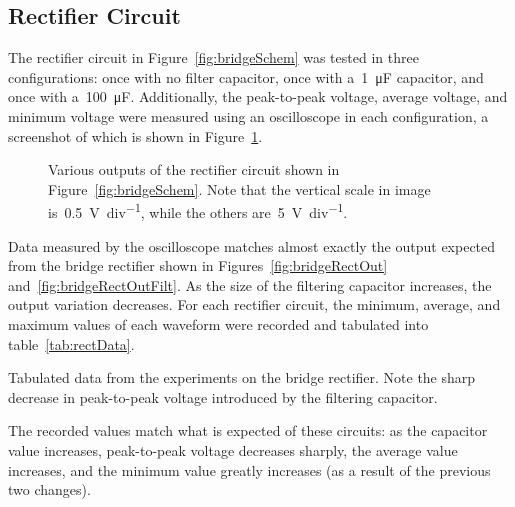 \subsection{Rectifier Circuit}
The rectifier circuit in Figure~\ref{fig:bridgeSchem} was tested in three
configurations: once with no filter capacitor, once with a~\SI{1}{\micro\farad}
capacitor, and once with a~\SI{100}{\micro\farad}.  Additionally, the
peak-to-peak voltage, average voltage, and minimum voltage were measured using
an oscilloscope in each configuration, a screenshot of which is shown in
Figure~\ref{fig:rectShots}.
%
\begin{figure}[H]
	\centering
	\quad
	\quad

	\parbox{.9\textwidth}{
	\caption[Oscilloscope Screenshot --- Rectifier Circuit]{Various outputs of
	the rectifier circuit shown in Figure~\ref{fig:bridgeSchem}.  Note that the
	vertical scale in image~ is~\SI{.5}{\volt\per
	div}, while the others are~\SI{5}{\volt\per div}.}
	\label{fig:rectShots}}
\end{figure}
%
Data measured by the oscilloscope matches almost exactly the output expected
from the bridge rectifier shown in Figures~\ref{fig:bridgeRectOut}
and~\ref{fig:bridgeRectOutFilt}.  As the size of the filtering capacitor
increases, the output variation decreases.  For each rectifier circuit, the minimum, average, and maximum
values of each waveform were recorded and tabulated into
table~\ref{tab:rectData}.
%
\begin{table}[H]
	\centering
	
	\parbox{.6\textwidth}{
	\caption[Rectifier data]{Tabulated data from the experiments on the bridge
	rectifier.  Note the sharp decrease in peak-to-peak voltage introduced by
	the filtering capacitor.}
	\label{tab:rectData}
	}
\end{table}
%
The recorded values match what is expected of these circuits: as the capacitor
value increases, peak-to-peak voltage decreases sharply, the average value
increases, and the minimum value greatly increases (as a result of the previous
two changes).



